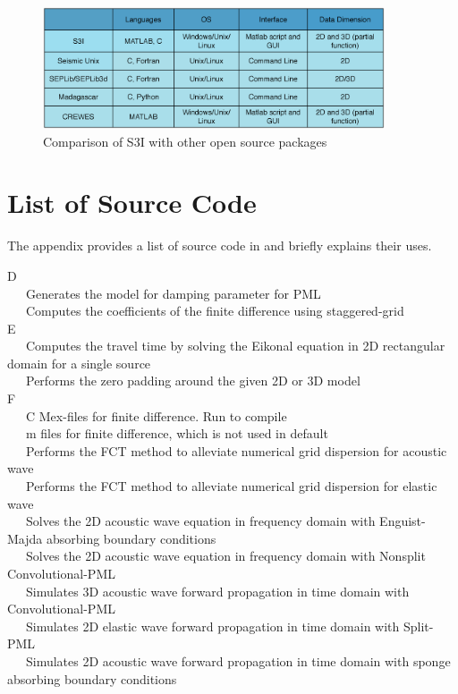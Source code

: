 \documentclass[11pt,titlepage]{article}
\theoremstyle{plain}
\theoremstyle{definition}
\theoremstyle{remark}
\numberwithin{equation}{section}
\begin{document}
\begin{figure}
\centering
\includegraphics[width=0.9\textwidth]{Fig/comp.eps}
\caption{Comparison of S3I with other open source packages}
\label{fig:comp}
\end{figure} 
\section{List of Source Code}
The appendix provides a list of source code in  and briefly 
explains their uses. 

\noindent D\\
~~~Generates the model for damping parameter for PML\\
~~~Computes the coefficients of the finite difference using staggered-grid\\

\noindent E\\
~~~Computes the travel time by solving the Eikonal equation in 2D rectangular domain for a single source\\
~~~Performs the zero padding around the given 2D or 3D model\\

\noindent F\\
~~~C Mex-files for finite difference. Run  to compile\\
~~~m files for finite difference, which is not used in default\\
~~~Performs the FCT method to alleviate numerical grid dispersion for acoustic wave\\
~~~Performs the FCT method to alleviate numerical grid dispersion for elastic wave\\
~~~Solves the 2D acoustic wave equation in frequency domain with Enguist-Majda absorbing boundary conditions\\
~~~Solves the 2D acoustic wave equation in frequency domain with Nonsplit Convolutional-PML\\
~~~Simulates 3D acoustic wave forward propagation in time domain with Convolutional-PML \\
~~~Simulates 2D elastic wave forward propagation in time domain with Split-PML\\
~~~Simulates 2D acoustic wave forward propagation in time domain with sponge absorbing boundary conditions\\
\end{document}
